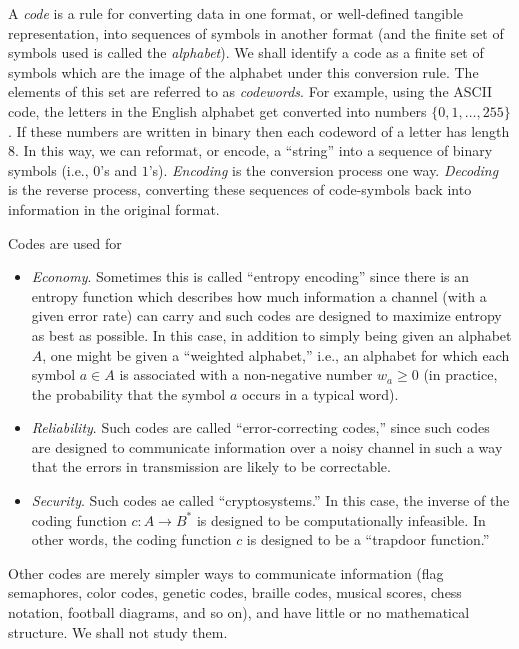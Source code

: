 A {\it code} is a rule for converting data in one
format, or well-defined tangible representation,
into sequences of symbols in another format (and the finite set of symbols
used is called the {\it alphabet}). We shall identify a code
as a finite set of symbols which are the image
of the alphabet under this conversion rule. The elements of this set
are referred to as {\it codewords}. For example, using the ASCII code,
the letters in the English alphabet get converted into numbers
$\{0, 1, \dots, 255\}$. If these numbers are written in binary
then each codeword of a letter has length 8. In this way, we can
reformat, or encode, a ``string'' into a sequence of binary symbols (i.e.,
$0$'s and $1$'s).
{\it Encoding} is the conversion process one way.
{\it Decoding} is the reverse
process, converting these sequences of code-symbols back into information
in the original format.


Codes are used for

\begin{itemize}
\item
{\it Economy}. Sometimes this is called ``entropy encoding''
since there is an entropy function which describes how much information
a channel (with a given error rate) can carry and such
codes are designed to maximize entropy as best as possible.
In this case, in addition to simply being given an alphabet $A$, one
might be given a ``weighted alphabet,'' i.e., an alphabet for which each
symbol $a\in A$ is associated with a non-negative number
$w_a\geq 0$ (in practice, the probability that the
symbol $a$ occurs in a typical word).

\item
{\it Reliability}. Such codes are called ``error-correcting codes,''
since such codes are designed to communicate information
over a noisy channel in such a way that the errors in transmission are
likely to be correctable.

\item
{\it Security}. Such codes ae called ``cryptosystems.''
In this case, the inverse of the coding function $c:A\to B^*$ is designed to be
computationally infeasible. In other words, the coding function
$c$ is designed to be a ``trapdoor function.''

\end{itemize}

Other codes are merely simpler ways to communicate information
(flag semaphores, color codes, genetic codes, braille codes, musical scores, chess
notation, football diagrams, and so on), and have little or no
mathematical structure. We shall not study them.



